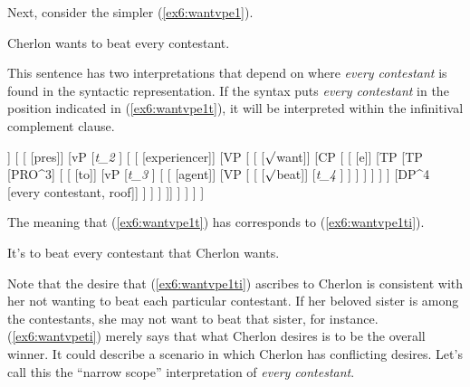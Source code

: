 Next, consider the simpler (\ref{ex6:wantvpe1}).
\begin{exe}
\raggedright
	\ex \label{ex6:wantvpe1}
	Cherlon wants to beat every contestant.
\end{exe}
This sentence has two interpretations that depend on where \textit{every contestant} is found in the syntactic representation. If the syntax puts \textit{every contestant} in the position indicated in (\ref{ex6:wantvpe1t}), it will be interpreted within the infinitival complement clause. 
\begin{exe}
\raggedright
	\ex \label{ex6:wantvpe1t}
	\footnotesize
	\begin{forest}
	[TP
		[DP^2 [Cherlon, roof]]
		[
			[ [pres]]
			[vP
				[\textit{t_2} ]
				[
					[ [experiencer]]
					[VP [ 
						[ [$\surd$want]]
						[CP [ 
							[ [e]]
							[TP
								[TP 
								[PRO^3]
								[
									[ [to]]
									[vP
										[\textit{t_3} ]
										[
											[ [agent]]
											[VP [
												[ [$\surd$beat]]
												[\textit{t_4} ]
											] ]
										 ]
									 ]
								] ]
								[DP^4 [every contestant, roof]]
							 ]
						] ]
					]]
				 ]
			 ]
		 ]
	]
	\end{forest}
\end{exe}
The meaning that (\ref{ex6:wantvpe1t}) has corresponds to (\ref{ex6:wantvpe1ti}).
\begin{exe}
\raggedright
	\ex \label{ex6:wantvpe1ti}
	It's to beat every contestant that Cherlon wants.
\end{exe}
Note that the desire that (\ref{ex6:wantvpe1ti}) ascribes to Cherlon is consistent with her not wanting to beat each particular contestant. If her beloved sister is among the contestants, she may not want to beat that sister, for instance. (\ref{ex6:wantvpeti}) merely says that what Cherlon desires is to be the overall winner. It could describe a scenario in which Cherlon has conflicting desires. Let's call this the ``narrow scope'' interpretation of \textit{every contestant}. 

